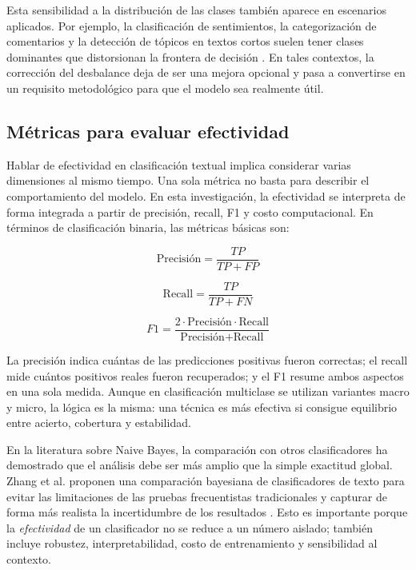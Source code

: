 Esta sensibilidad a la distribución de las clases también aparece en escenarios aplicados. Por ejemplo, la clasificación de sentimientos, la categorización de comentarios y la detección de tópicos en textos cortos suelen tener clases dominantes que distorsionan la frontera de decisión \cite{Pratmanto2020,Musleh2023,Risal202335,Wawer20191321}. En tales contextos, la corrección del desbalance deja de ser una mejora opcional y pasa a convertirse en un requisito metodológico para que el modelo sea realmente útil.

\subsection{Métricas para evaluar efectividad}

Hablar de efectividad en clasificación textual implica considerar varias dimensiones al mismo tiempo. Una sola métrica no basta para describir el comportamiento del modelo. En esta investigación, la efectividad se interpreta de forma integrada a partir de precisión, recall, F1 y costo computacional. En términos de clasificación binaria, las métricas básicas son:

\begin{equation}
\text{Precisión} = \frac{TP}{TP+FP}
\label{eq:precision}
\end{equation}

\begin{equation}
\text{Recall} = \frac{TP}{TP+FN}
\label{eq:recall}
\end{equation}

\begin{equation}
F1 = \frac{2 \cdot \text{Precisión} \cdot \text{Recall}}{\text{Precisión} + \text{Recall}}
\label{eq:f1}
\end{equation}

La precisión indica cuántas de las predicciones positivas fueron correctas; el recall mide cuántos positivos reales fueron recuperados; y el F1 resume ambos aspectos en una sola medida. Aunque en clasificación multiclase se utilizan variantes macro y micro, la lógica es la misma: una técnica es más efectiva si consigue equilibrio entre acierto, cobertura y estabilidad.

En la literatura sobre Naive Bayes, la comparación con otros clasificadores ha demostrado que el análisis debe ser más amplio que la simple exactitud global. Zhang et al. proponen una comparación bayesiana de clasificadores de texto para evitar las limitaciones de las pruebas frecuentistas tradicionales y capturar de forma más realista la incertidumbre de los resultados \cite{10.1145/2911451.2911547}. Esto es importante porque la \textit{efectividad} de un clasificador no se reduce a un número aislado; también incluye robustez, interpretabilidad, costo de entrenamiento y sensibilidad al contexto.

